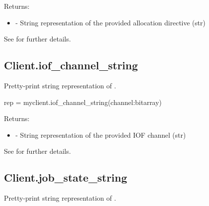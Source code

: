 \begin{arglist}
\end{arglist}

Returns:
\begin{itemize}
    \item {} - String representation of the provided allocation directive (str)
\end{itemize}

See  for further details.


\subsection{Client.iof_channel_string}

\summary

Pretty-print string representation of .

\format

\pyspecificstart
\begin{codepar}
rep = myclient.iof_channel_string(channel:bitarray)
\end{codepar}
\pyspecificend

\begin{arglist}
\end{arglist}

Returns:
\begin{itemize}
    \item {} - String representation of the provided IOF channel (str)
\end{itemize}

See  for further details.


\subsection{Client.job_state_string}

\summary

Pretty-print string representation of .

\format

